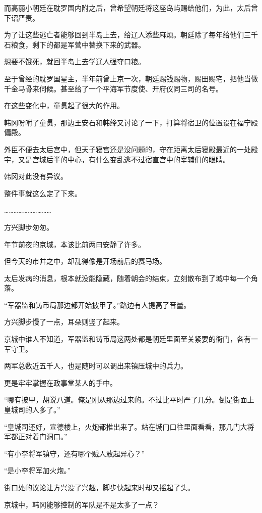 而高丽小朝廷在耽罗国内附之后，曾希望朝廷将这座岛屿赐给他们，为此，太后曾下诏严责。

为了让这些逃亡者能够回到半岛上去，给辽人添些麻烦。朝廷除了每年给他们三千石粮食，剩下的都是军营中替换下来的武器。

想要不饿死，就回半岛上去学辽人强夺口粮。

至于曾经的耽罗国星主，半年前曾上京一次，朝廷赐钱赐物，赐田赐宅，把他当做千金马骨来伺候。甚至给了一个平海军节度使、开府仪同三司的名号。

在这些变化中，童贯起了很大的作用。

韩冈吩咐了童贯，那边王安石和韩绛又讨论了一下，打算将宿卫的位置设在福宁殿偏殿。

外臣不便去太后宫中，但天子寝宫还是没问题的，守在距离太后寝殿最近的一处殿宇，又是宫城后半的中心，有什么变乱逃不过宿直宫中的宰辅们的眼睛。

韩冈对此没有异议。

整件事就这么定了下来。

…………………………

方兴脚步匆匆。

年节前夜的京城，本该比前两曰安静了许多。

但今天的市井之中，却乱得像是开场前后的赛马场。

太后发病的消息，根本就没能隐藏，随着朝会的结束，立刻散布到了城中每一个角落。

“军器监和铸币局那边都开始披甲了。”路边有人提高了音量。

方兴脚步慢了一点，耳朵则竖了起来。

京城中谁人不知道，军器监和铸币局这两处都是朝廷里面至关紧要的衙门，各有一军守卫。

两军总数近五千人，也是随时可以调出来镇压城中的兵力。

更是牢牢掌握在政事堂某人的手中。

“哪有披甲，胡说八道。俺是刚从那边过来的。不过比平时严了几分。倒是街面上皇城司的人多了。”

“皇城司还好，宣德楼上，火炮都推出来了。站在城门口往里面看看，那几门大将军都正对着门洞口。”

“有小李将军镇守，还有哪个贼人敢起异心？”

“是小李将军加火炮。”

街口处的议论让方兴没了兴趣，脚步快起来时却又摇起了头。

京城中，韩冈能够控制的军队是不是太多了一点？
